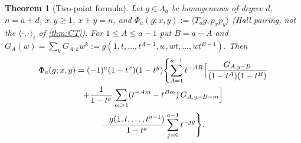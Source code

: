 \documentclass[11pt]{amsart}
\newtheorem{theorem}{Theorem}[section]
\theoremstyle{definition}
\theoremstyle{remark}
\numberwithin{equation}{section}
\newcommand{\Lam}{\Lambda}
\begin{document}
\begin{theorem}[Two-point formula]\label{thm:2pt}
Let $g\in\Lam_a$ be homogeneous of degree $d$, $n=a+d$, $x,y\ge1$, $x+y=n$, and $\Phi_a(g;x,y):=\langle T_ag,p_xp_y\rangle$ (Hall pairing, not the $\langle\cdot,\cdot\rangle_t$ of \cref{thm:CT}). For $1\le A\le a-1$ put $B=a-A$ and $G_A(w)=\sum_kG_{A,k}w^k:=g(1,t,\dots,t^{A-1},w,wt,\dots,wt^{B-1})$. Then
\begin{multline*}
\Phi_a(g;x,y)=(-1)^a(1-t^x)(1-t^y)\Biggl\{\sum_{A=1}^{a-1}t^{-AB}\Bigl[\frac{G_{A,y-B}}{(1-t^A)(1-t^B)}\\+\frac{1}{1-t^a}\sum_{m\ge1}(t^{-Am}-t^{Bm})\,G_{A,y-B-m}\Bigr]\\
-\frac{g(1,t,\dots,t^{a-1})}{1-t^a}\sum_{j=0}^{a-1}t^{-jy}\Biggr\}.
\end{multline*}
\end{theorem}
\end{document}
